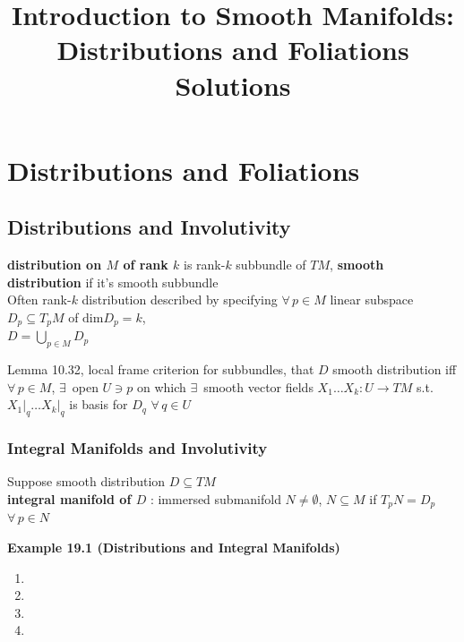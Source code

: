 \documentclass[11pt]{amsart}
\title{Introduction to Smooth Manifolds: Distributions and Foliations Solutions}
\theoremstyle{definition}
\begin{document}
\maketitle
\section{Distributions and Foliations}
%
%

\subsection*{Distributions and Involutivity}

\textbf{distribution on $M$ of rank $k$} is rank-$k$ subbundle of $TM$, \textbf{smooth distribution} if it's smooth subbundle \\
Often rank-$k$ distribution described by specifying $\forall \, p \in M$ linear subspace $D_p \subseteq T_pM$ of $\text{dim}D_p = k$, \\
\phantom{\quad \quad \,} $D = \bigcup_{p \in M} D_p$

Lemma 10.32, local frame criterion for subbundles, that $D$ smooth distribution iff $\forall \, p \in M$, $\exists \, $ open $U \ni p$ on which $\exists \, $ smooth vector fields $X_1 \dots X_k : U \to TM$ s.t. $\left. X_1 \right|_q \dots \left. X_k \right|_q$ is basis for $D_q$ $\forall \, q \in U$

\subsubsection*{Integral Manifolds and Involutivity}

Suppose smooth distribution $D \subseteq TM$ \\
\textbf{integral manifold of $D$} : immersed submanifold $N \neq \emptyset$, $N \subseteq M$ if $T_pN = D_p$ $\forall \, p \in N$

\textbf{Example 19.1 (Distributions and Integral Manifolds)}

\begin{enumerate}
\item[(a)]
\item[(b)]
\item[(c)]
\item[(d)]
\end{enumerate}
\end{document}
